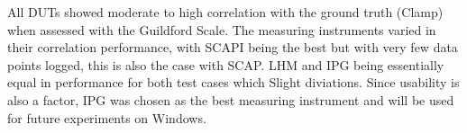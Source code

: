   All DUTs showed moderate to high correlation with the ground truth (Clamp) when assessed with the Guildford Scale. The measuring instruments varied in their correlation performance, with SCAPI being the best but with very few data points logged, this is also the case with SCAP. LHM and IPG being essentially equal in performance for both test cases which Slight diviations. Since usability is also a factor, IPG was chosen as the best measuring instrument and will be used for future experiments on Windows.


